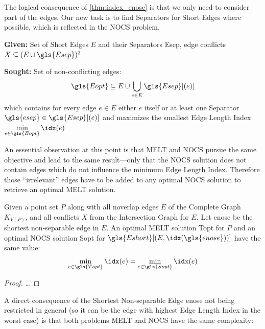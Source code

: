 The logical consequence of \cref{thm:index_enose} is that we only need
to consider part of the edges. Our new task is to find Separators for
Short Edges where possible, which is reflected in the \gls{NOCS}
problem.

\begin{problem}
  \hfill
  \begin{labeling}{\hspace{4em}}
    \item[\textbf{Given:}]
      Set of Short Edges \(E\) and their Separators \gls{Esep},
      edge conflicts \(X \subseteq (E \cup \gls{Esep})^2\)
    \item[\textbf{Sought:}]
      Set of non-conflicting edges:
      \[
        \gls{Eopt} \subseteq E
        \cup \bigcup\limits_{e \in E} \gls{Esep}[(e)]
      \]
      which contains for every edge \(e \in E\) either \(e\) itself
      or at least one Separator \(\gls{esep} \in \gls{Esep}[(e)]\)
      and maximizes the smallest Edge Length Index
      \(\min\limits_{e \in \gls{Eopt}} \idx(e)\)
  \end{labeling}
\end{problem}

An essential observation at this point is that \gls{MELT} and
\gls{NOCS} pursue the same objective and lead to the same result---only
that the \gls{NOCS} solution does not contain edges which do not
influence the minimum Edge Length Index. Therefore those
``irrelevant'' edges have to be added to any optimal \gls{NOCS}
solution to retrieve an optimal \gls{MELT} solution.

\begin{theorem}
  \label{thm:equality_melt_nocs}
  Given a point set \(P\) along with all \gls{noverlap} edges \(E\)
  of the Complete Graph \(K_{V(P)}\), and all conflicts \(X\) from the
  Intersection Graph for \(E\). 
  Let \gls{enose} be the shortest non-separable edge in \(E\).
  An optimal \gls{MELT} solution \gls{Topt} for \(P\)
  and an optimal \gls{NOCS} solution \gls{Sopt} for
  \(\gls{Eshort}[(E,\idx(\gls{enose}))]\) have the same value:
  \[
    \min\limits_{e \in \gls{Topt}} \idx(e)
    = \min\limits_{e \in \gls{Sopt}} \idx(e)
  \]
  \begin{proof}
  \ldots{}
  \end{proof}
\end{theorem}

A direct consequence of the Shortest Non-separable Edge \gls{enose}
not being restricted in general (so it can  be the edge with highest
Edge Length Index in the worst case) is that both problems \gls{MELT}
and \gls{NOCS} have the same complexity:

